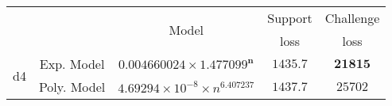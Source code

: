 \begin{tabular}{ccccc} 
\hline 
 &  & \multirow{2}{*}{Model} & Support & Challenge\tabularnewline 
 &  &  & loss  & loss\tabularnewline 
\hline 
\hline 
\multirow{2}{*}{d4} & Exp. Model & $\mathbf{0.004660024\times 1.477099^{n}}$ & $\mathbf{1435.7}$ & $\mathbf{21815}$ \tabularnewline 
 & Poly. Model & $4.69294\times10^{-8}\times n^{6.407237}$ & $1437.7$ & $25702$ \tabularnewline 
\hline 
\end{tabular} 

